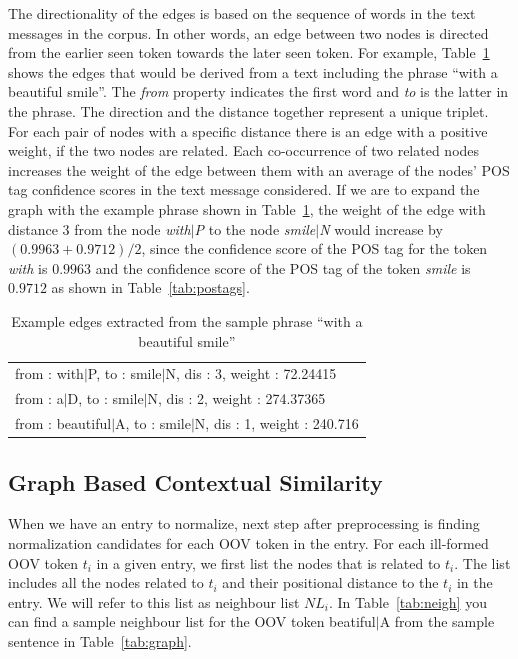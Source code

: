 \documentclass[preprint,review,12pt]{elsarticle}
\begin{document}
The directionality of the edges is based  on the sequence of words in the text messages in the corpus. In other words, an edge between two nodes is directed from the earlier seen token towards the later seen token. For example, Table~\ref{tab:edges} shows the edges that would be derived from a text including the phrase ``with a beautiful smile''. The \textit{from} property indicates the first word and \textit{to} is the latter in the phrase. The direction and the distance together represent a unique triplet. For each pair of nodes with a specific distance there is an edge with a positive weight, if the two nodes are related. Each co-occurrence of two related nodes increases the weight of the edge between them with an average of the nodes' POS tag confidence scores in the text message considered. If we are to expand the graph with the example phrase shown in Table~\ref{tab:edges}, the weight of the edge with distance $3$ from the node \emph{with$|$P}  to the node  \emph{smile$|$N} would increase by $(0.9963+0.9712)/2$, since the confidence score of the POS tag for the token \emph{with} is  $0.9963$ and the confidence score of the POS tag of the token \emph{smile} is $0.9712$ as shown in Table~\ref{tab:postags}.

\begin{table}[hbt]
  \centering
  \begin{tabular}[tc]{l}
 from : with$|$P, to : smile$|$N, dis : 3, weight : 72.24415 \\
 from : a$|$D, to : smile$|$N, dis : 2, weight : 274.37365 \\
 from : beautiful$|$A, to : smile$|$N, dis : 1, weight : 240.716 \\
\end{tabular}
  \caption{Example edges extracted from the sample phrase  ``with a beautiful smile''}
\label{tab:edges}
\end{table}


\subsection{Graph Based Contextual Similarity}

When we have an entry to normalize, next step after preprocessing is finding normalization candidates for each OOV token in the entry. For each ill-formed OOV token $t_i$ in a given entry, we first list the nodes that is related to $t_i$. The list includes all the nodes related to $t_i$ and their positional distance to the $t_i$ in the entry. We will refer to this list as neighbour list $NL_i$. In Table~\ref{tab:neigh} you can find a sample neighbour list for the OOV token beatiful$|$A from the sample sentence in Table~\ref{tab:graph}.
\end{document}
